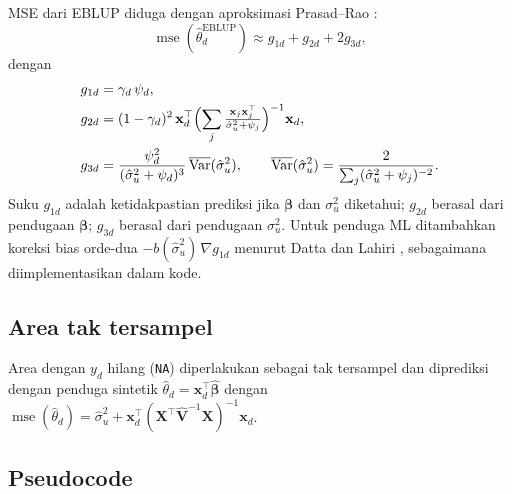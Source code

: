 \documentclass[11pt,a4paper]{article}
\theoremstyle{definition}
\begin{document}
MSE dari EBLUP diduga dengan aproksimasi Prasad--Rao \cite{prasad1990}:
\begin{equation}
  \operatorname{mse}(\hat{\theta}_d^{\mathrm{EBLUP}})
  \approx g_{1d} + g_{2d} + 2g_{3d},
\end{equation}
dengan
\begin{align}
  g_{1d} &= \gamma_d\,\psi_d, \\
  g_{2d} &= (1-\gamma_d)^2\,
            \mathbf{x}_d^{\top}
            \Bigl(\sum_{j}\tfrac{\mathbf{x}_j\mathbf{x}_j^{\top}}
                                   {\hat{\sigma}_u^2+\psi_j}\Bigr)^{-1}
            \mathbf{x}_d, \\
  g_{3d} &= \frac{\psi_d^2}{(\hat{\sigma}_u^2+\psi_d)^3}\,
            \overline{\operatorname{Var}}(\hat{\sigma}_u^2),
  \qquad
  \overline{\operatorname{Var}}(\hat{\sigma}_u^2)
    = \frac{2}{\sum_j (\hat{\sigma}_u^2+\psi_j)^{-2}}.
\end{align}
Suku $g_{1d}$ adalah ketidakpastian prediksi jika $\boldsymbol{\beta}$ dan $\sigma_u^2$
diketahui; $g_{2d}$ berasal dari pendugaan $\boldsymbol{\beta}$; $g_{3d}$ berasal dari
pendugaan $\sigma_u^2$. Untuk penduga ML ditambahkan koreksi bias orde-dua
$-b(\hat{\sigma}_u^2)\,\nabla g_{1d}$ menurut Datta dan Lahiri \cite{datta2000},
sebagaimana diimplementasikan dalam kode.

\subsection{Area tak tersampel}

Area dengan $y_d$ hilang (\texttt{NA}) diperlakukan sebagai tak tersampel dan diprediksi
dengan penduga sintetik $\hat{\theta}_d = \mathbf{x}_d^{\top}\hat{\boldsymbol{\beta}}$
dengan $\operatorname{mse}(\hat{\theta}_d) = \hat{\sigma}_u^2 +
\mathbf{x}_d^{\top}(\mathbf{X}^{\top}\hat{\mathbf{V}}^{-1}\mathbf{X})^{-1}\mathbf{x}_d$.

\subsection{Pseudocode}
\end{document}
